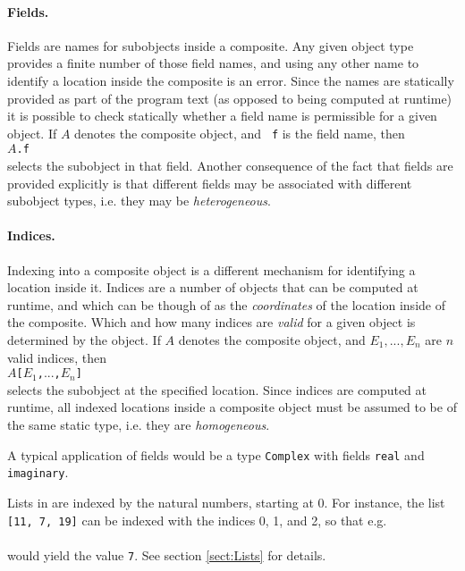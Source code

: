 \paragraph{Fields.} 
Fields are names for subobjects inside a composite. Any given object
type provides a finite number of those field names, and using any
other name to identify a location inside the composite is an error.
Since the names are statically provided as part of the program text
(as opposed to being computed at runtime) it is possible to check
statically whether a field name is permissible for a given object. If
$A$ denotes the composite object, and {\tt
  f} is the field name, then\\
\exindent$A${\tt .f}\\
selects the subobject in that field. Another consequence of the fact
that fields are provided explicitly is that different fields may
be associated with different subobject
types, i.e. they may be {\em heterogeneous}.

\paragraph{Indices.} 
Indexing into a composite object is a different
mechanism for identifying a location inside it. Indices are a number
of objects that can be computed at runtime, and which can be though of
as the {\em coordinates} of the location inside of the composite.
Which and how many indices are {\em valid} for a given object is
determined by the object. If $A$ denotes the composite object, and
$E_1, ..., E_n$ are $n$ valid
indices, then \\
\exindent$A${\tt[}$E_1${\tt ,}$...${\tt ,}$E_n${\tt ]}\\
selects the subobject at the specified location. Since indices are
computed at runtime, all indexed locations inside a composite object
must be assumed to be of the same static type, i.e. they are {\em
  homogeneous}.

\begin{example}
  A typical application of fields would be a type {\tt Complex} with
  fields {\tt real} and {\tt imaginary}.

  Lists in \Cal are indexed by the natural numbers, starting at
  0. For instance, the list {\tt [11, 7, 19]} can be indexed with the
  indices 0, 1, and 2, so that e.g.\\
  \exindent{\tt [11, 7, 19][1]}\\
  would yield the value {\tt 7}. See section \ref{sect:Lists} for
  details.
\end{example}

